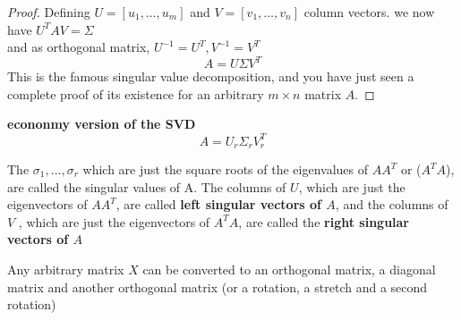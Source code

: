 \begin{proof}
Defining $U = [u_1, \ldots, u_m]$ and $V = [v_1, \ldots, v_n]$ column vectors.
we now have $U^TAV = \Sigma$\\
and as orthogonal matrix, $U^{-1} = U^T, V^{-1} = V^T$
$$ A = U \Sigma V^T $$
This is the famous singular value decomposition, and you have just seen a complete proof of its existence for an arbitrary $m \times n$ matrix $A$.
\end{proof}

\begin{remark}
\textbf{econonmy version of the SVD}\\
$$ A = U_r \Sigma_r V_r^T $$
\end{remark}

\begin{remark}
The $\sigma_1, \ldots, \sigma_r$ which are just the square roots of the eigenvalues of $A A^T$ or ($A^T A$), are called the singular values of A.
The columns of $U$, which are just the eigenvectors of $A A^T$, are called \textbf{left singular vectors of $A$},
and the columns of $V$ , which are just the eigenvectors of $A^T A$, are called the \textbf{right singular vectors of $A$}
\end{remark}

Any arbitrary matrix $X$ can be converted to an orthogonal matrix, a diagonal matrix and another orthogonal matrix
(or a rotation, a stretch and a second rotation)

